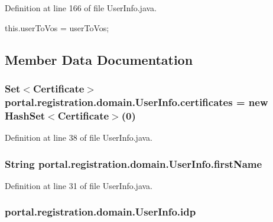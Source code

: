 Definition at line 166 of file UserInfo.java.


\begin{DoxyCode}
                                                          {
                this.userToVos = userToVos;
        }
\end{DoxyCode}


\subsection{Member Data Documentation}
\hypertarget{classportal_1_1registration_1_1domain_1_1UserInfo_a5923ed9351bde36f580647933f7b3fe0}{
\subsubsection[{certificates}]{\setlength{\rightskip}{0pt plus 5cm}Set$<${\bf Certificate}$>$ {\bf portal.registration.domain.UserInfo.certificates} = new HashSet$<${\bf Certificate}$>$(0)}}
\label{classportal_1_1registration_1_1domain_1_1UserInfo_a5923ed9351bde36f580647933f7b3fe0}


Definition at line 38 of file UserInfo.java.

\hypertarget{classportal_1_1registration_1_1domain_1_1UserInfo_a40352804afaf61b92208e4835ca8e5af}{
\subsubsection[{firstName}]{\setlength{\rightskip}{0pt plus 5cm}String {\bf portal.registration.domain.UserInfo.firstName}}}
\label{classportal_1_1registration_1_1domain_1_1UserInfo_a40352804afaf61b92208e4835ca8e5af}


Definition at line 31 of file UserInfo.java.

\hypertarget{classportal_1_1registration_1_1domain_1_1UserInfo_a9ee2008ca7555a9237135aedd8d0949b}{
\subsubsection[{idp}]{ {\bf portal.registration.domain.UserInfo.idp}}}
\label{classportal_1_1registration_1_1domain_1_1UserInfo_a9ee2008ca7555a9237135aedd8d0949b}


